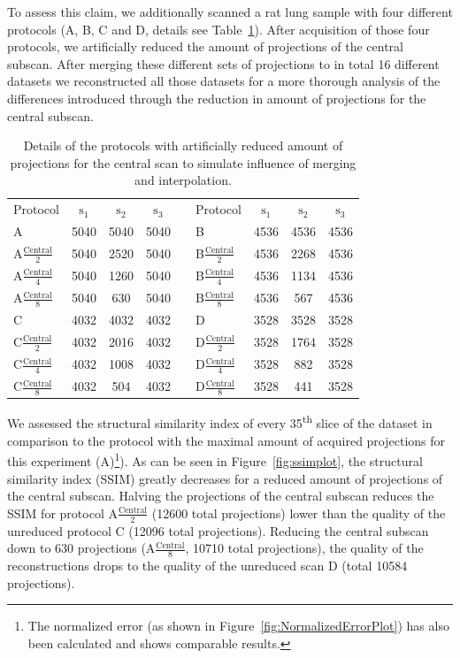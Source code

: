 \documentclass{article}
\begin{document}
To assess this claim, we additionally scanned a rat lung sample with four different protocols (A, B, C and D, details see Table~\ref{tab:abcd}). After acquisition of those four protocols, we artificially reduced the amount of projections of the central subscan. After merging these different sets of projections to in total 16 different datasets we reconstructed all those datasets for a more thorough analysis of the differences introduced through the reduction in amount of projections for the central subscan.

\begin{table}
	\centering
	\caption{Details of the protocols with artificially reduced amount of projections for the central scan to simulate influence of merging and interpolation.}
	\begin{tabular}{lcccclccc}
		Protocol & $\textrm{s}_{1}$ & $\textrm{s}_{2}$ & $\textrm{s}_{3}$ &  &  Protocol & $\textrm{s}_{1}$ & $\textrm{s}_{2}$ & $\textrm{s}_{3}$ \\
		A & 5040 & 5040 & 5040 &  &  B & 4536 & 4536 & 4536 \\
		A$\frac{\textrm{Central}}{2}$ & 5040 & 2520 & 5040 &  & B$\frac{\textrm{Central}}{2}$ & 4536 & 2268 & 4536 \\
		A$\frac{\textrm{Central}}{4}$ & 5040 & 1260 & 5040 &  & B$\frac{\textrm{Central}}{4}$ & 4536 & 1134 & 4536 \\
		A$\frac{\textrm{Central}}{8}$ & 5040 & 630 & 5040 &  & B$\frac{\textrm{Central}}{8}$ & 4536 & 567 & 4536 \\
		\hline
		C & 4032 & 4032 & 4032 &  &  D & 3528 & 3528 & 3528 \\
		C$\frac{\textrm{Central}}{2}$ & 4032 & 2016 & 4032 &  & D$\frac{\textrm{Central}}{2}$ & 3528 & 1764 & 3528 \\
		C$\frac{\textrm{Central}}{4}$ & 4032 & 1008 & 4032 &  & D$\frac{\textrm{Central}}{4}$ & 3528 & 882 & 3528 \\
		C$\frac{\textrm{Central}}{8}$ & 4032 & 504 & 4032 &  & D$\frac{\textrm{Central}}{8}$ & 3528 & 441 & 3528 \\
	\end{tabular}  
	\label{tab:abcd}
\end{table}

We assessed the structural similarity index \cite{Wang2004} of every 35\textsuperscript{th} slice of the dataset in comparison to the protocol with the maximal amount of acquired projections for this experiment (A)\footnote{The normalized error (as shown in Figure~\ref{fig:NormalizedErrorPlot}) has also been calculated and shows comparable results.}). As can be seen in Figure~\ref{fig:ssimplot}, the structural similarity index (SSIM) greatly decreases for a reduced amount of projections of the central subscan. Halving the projections of the central subscan reduces the SSIM for protocol A$\frac{\textrm{Central}}{2}$ (12600 total projections) lower than the quality of the unreduced protocol C (12096 total projections). Reducing the central subscan down to 630 projections (A$\frac{\textrm{Central}}{8}$, 10710 total projections), the quality of the reconstructions drops to the quality of the unreduced scan D (total 10584 projections). 
\end{document}
